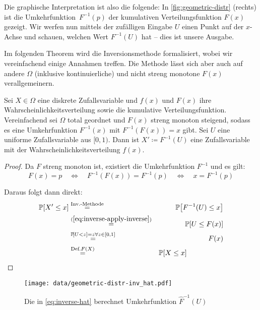 Die graphische Interpretation ist also die folgende:
In \cref{fig:geometric-distr} (rechts) ist die Umkehrfunktion~$F^{-1}(p)$ der kumulativen Verteilungsfunktion $F(x)$ gezeigt.
Wir werfen nun mittels der zufälligen Eingabe $U$ einen Punkt auf der $x$-Achse und schauen, welchen Wert $F^{-1}(U)$ hat -- dies ist unsere Ausgabe.

Im folgenden Theorem wird die Inversionsmethode formalisiert, wobei wir vereinfachend einige Annahmen treffen.
Die Methode lässt sich aber auch auf andere $\Omega$ (inklusive kontinuierliche) und nicht streng monotone $F(x)$ verallgemeinern.

\begin{theorem}
    Sei $X \in \Omega$ eine diskrete Zufallsvariable und $f(x)$ und $F(x)$ ihre Wahrscheinlichkeitsverteilung sowie die kumulative Verteilungsfunktion.
    Vereinfachend sei $\Omega$ total geordnet und $F(x)$ streng monoton steigend, sodass es eine Umkehrfunktion $F^{-1}(x)$ mit $F^{-1}(F(x)) = x$ gibt.
    Sei $U$ eine uniforme Zufallsvariable aus $[0, 1)$.
    Dann ist $X' \coloneq F^{-1}(U)$ eine Zufallsvariable mit der Wahrscheinlichkeitsverteilung $f(x)$.
\end{theorem}

\begin{proof}
    \noindent Da $F$ streng monoton ist, existiert die Umkehrfunktion $F^{-1}$ und es gilt:
    \begin{equation}\label{eq:inverse-apply-inverse}
        F(x) = p
        \quad\Leftrightarrow\quad F^{-1}(F(x)) = F^{-1}(p)
        \quad\Leftrightarrow\quad x = F^{-1}(p)
    \end{equation}

    \noindent Daraus folgt dann direkt:
    \begin{eqnarray}
        \prob{X' \le x} &\stackrel{\text{Inv.-Methode}} = & \prob{F^{-1}(U) \le x} \\
        &\stackrel{(\ref{eq:inverse-apply-inverse})}{=}& \prob{U \le F(x)} \\
        &\stackrel{\prob{U < z} = z \forall z \in [0, 1]}=& F(x) \\
        &\stackrel{\text{Def.} F(X)}=& \prob{X \le x} \hspace{5em}\hfill \qedhere
    \end{eqnarray}
\end{proof}

\bigskip
\bigskip

\begin{figure}
    \begin{center}
        \texttt{[image: data/geometric-distr-inv\_hat.pdf]}
    \end{center}
    \caption{Die in \cref{eq:inverse-hat} berechnet Umkehrfunktion $\hat F^{-1}(U)$}

\end{figure}

